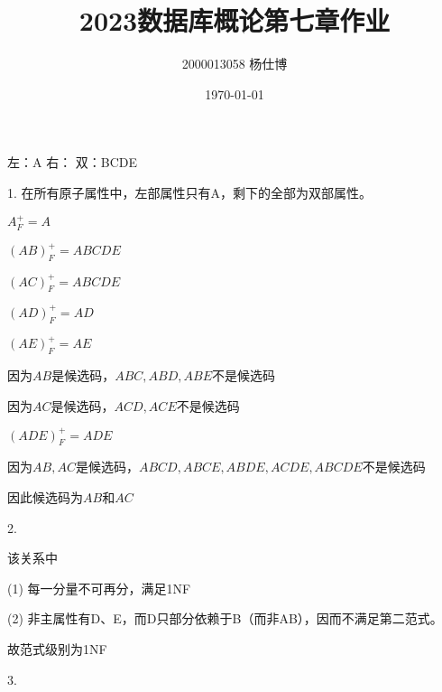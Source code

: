 \documentclass[UTF8]{ctexart}
\title{\vspace{-4cm}2023数据库概论第七章作业}
\author{2000013058 杨仕博}
\date{\today}
\begin{document}
\maketitle

\subsection{}

左：A
右：
双：BCDE

1. 在所有原子属性中，左部属性只有A，剩下的全部为双部属性。

$A_F^+ = A$

$(AB)_F^+ = ABCDE$

$(AC)_F^+ = ABCDE$

$(AD)_F^+ = AD$

$(AE)_F^+ = AE$

因为$AB$是候选码，$ABC, ABD, ABE$不是候选码

因为$AC$是候选码，$ACD, ACE$不是候选码

$(ADE)_F^+ = ADE$

因为$AB, AC$是候选码，$ABCD, ABCE, ABDE, ACDE, ABCDE$不是候选码

因此候选码为$AB$和$AC$

2. 

该关系中

(1) 每一分量不可再分，满足1NF

(2) 非主属性有D、E，而D只部分依赖于B（而非AB），因而不满足第二范式。

故范式级别为1NF

3. 
\end{document}
